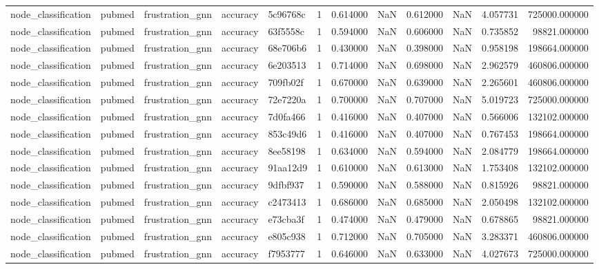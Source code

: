 \begin{tabular}{lllllrrrrrrr}
node_classification & pubmed & frustration_gnn & accuracy & 5c96768c & 1 & 0.614000 & NaN & 0.612000 & NaN & 4.057731 & 725000.000000 \\
node_classification & pubmed & frustration_gnn & accuracy & 63f5558c & 1 & 0.594000 & NaN & 0.606000 & NaN & 0.735852 & 98821.000000 \\
node_classification & pubmed & frustration_gnn & accuracy & 68e706b6 & 1 & 0.430000 & NaN & 0.398000 & NaN & 0.958198 & 198664.000000 \\
node_classification & pubmed & frustration_gnn & accuracy & 6e203513 & 1 & 0.714000 & NaN & 0.698000 & NaN & 2.962579 & 460806.000000 \\
node_classification & pubmed & frustration_gnn & accuracy & 709fb02f & 1 & 0.670000 & NaN & 0.639000 & NaN & 2.265601 & 460806.000000 \\
node_classification & pubmed & frustration_gnn & accuracy & 72e7220a & 1 & 0.700000 & NaN & 0.707000 & NaN & 5.019723 & 725000.000000 \\
node_classification & pubmed & frustration_gnn & accuracy & 7d0fa466 & 1 & 0.416000 & NaN & 0.407000 & NaN & 0.566006 & 132102.000000 \\
node_classification & pubmed & frustration_gnn & accuracy & 853c49d6 & 1 & 0.416000 & NaN & 0.407000 & NaN & 0.767453 & 198664.000000 \\
node_classification & pubmed & frustration_gnn & accuracy & 8ee58198 & 1 & 0.634000 & NaN & 0.594000 & NaN & 2.084779 & 198664.000000 \\
node_classification & pubmed & frustration_gnn & accuracy & 91aa12d9 & 1 & 0.610000 & NaN & 0.613000 & NaN & 1.753408 & 132102.000000 \\
node_classification & pubmed & frustration_gnn & accuracy & 9dfbf937 & 1 & 0.590000 & NaN & 0.588000 & NaN & 0.815926 & 98821.000000 \\
node_classification & pubmed & frustration_gnn & accuracy & c2473413 & 1 & 0.686000 & NaN & 0.685000 & NaN & 2.050498 & 132102.000000 \\
node_classification & pubmed & frustration_gnn & accuracy & e73cba3f & 1 & 0.474000 & NaN & 0.479000 & NaN & 0.678865 & 98821.000000 \\
node_classification & pubmed & frustration_gnn & accuracy & e805c938 & 1 & 0.712000 & NaN & 0.705000 & NaN & 3.283371 & 460806.000000 \\
node_classification & pubmed & frustration_gnn & accuracy & f7953777 & 1 & 0.646000 & NaN & 0.633000 & NaN & 4.027673 & 725000.000000 \\

\end{tabular}

